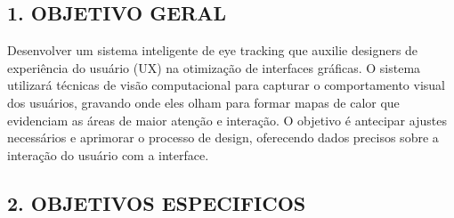 \subsection*{1. OBJETIVO GERAL}
Desenvolver um sistema inteligente de eye tracking que auxilie designers de experiência do usuário (UX) na otimização de interfaces gráficas. O sistema utilizará técnicas de visão computacional para capturar o comportamento visual dos usuários, gravando onde eles olham para formar mapas de calor que evidenciam as áreas de maior atenção e interação. O objetivo é antecipar ajustes necessários e aprimorar o processo de design, oferecendo dados precisos sobre a interação do usuário com a interface.

\subsection*{2. OBJETIVOS ESPECIFICOS}

